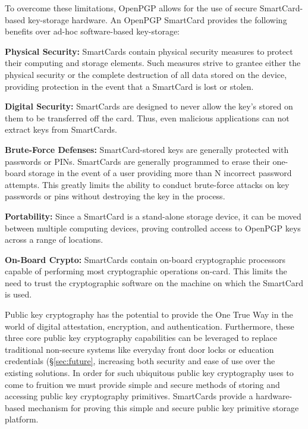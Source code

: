 \documentclass[11pt, twocolumn]{article}
\newenvironment{packed_desc}{
\begin{description}
  \setlength{\itemsep}{1pt}
  \setlength{\parskip}{0pt}
  \setlength{\parsep}{0pt}
}{\end{description}}
\begin{document}
To overcome these limitations, OpenPGP allows for the use of secure
SmartCard-based key-storage hardware. An OpenPGP SmartCard provides
the following benefits over ad-hoc software-based key-storage:

\begin{packed_desc}
\item{\textbf{Physical Security:}} SmartCards contain physical
  security measures to protect their computing and storage
  elements. Such measures strive to grantee either the physical
  security or the complete destruction of all data stored on the
  device, providing protection in the event that a SmartCard is lost
  or stolen.
\item{\textbf{Digital Security:}} SmartCards are designed to never
  allow the key's stored on them to be transferred off the card. Thus,
  even malicious applications can not extract keys from SmartCards.
\item{\textbf{Brute-Force Defenses:}} SmartCard-stored keys are
  generally protected with passwords or PINs. SmartCards are generally
  programmed to erase their one-board storage in the event of a user
  providing more than N incorrect password attempts. This greatly
  limits the ability to conduct brute-force attacks on key passwords
  or pins without destroying the key in the process.
\item{\textbf{Portability:}} Since a SmartCard is a stand-alone
  storage device, it can be moved between multiple computing devices,
  proving controlled access to OpenPGP keys across a range of
  locations.
\item{\textbf{On-Board Crypto:}} SmartCards contain on-board
  cryptographic processors capable of performing most cryptographic
  operations on-card. This limits the need to trust the cryptographic
  software on the machine on which the SmartCard is used.
\end{packed_desc}

Public key cryptography has the potential to provide the One True
Way\texttrademark{} in the world of digital attestation, encryption,
and authentication. Furthermore, these three core public key
cryptography capabilities can be leveraged to replace traditional
non-secure systems like everyday front door locks or education
credentials (\S\ref{sec:future}, increasing both security and ease of
use over the existing solutions. In order for such ubiquitous public
key cryptography uses to come to fruition we must provide simple and
secure methods of storing and accessing public key cryptography
primitives. SmartCards provide a hardware-based mechanism for proving
this simple and secure public key primitive storage platform.
\end{document}
